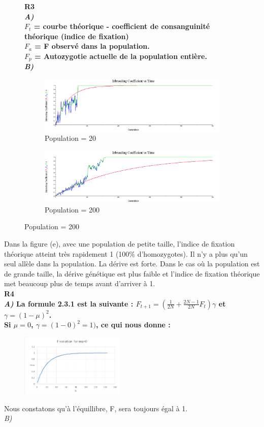 \documentclass[a4paper]{report}
\renewcommand{\textbf}[1]{\begingroup\bfseries\mathversion{bold}#1\endgroup}
\begin{document}
\begin{figure}[!h]
\textbf{R3}\\
\textit{A)}\\
$F_t$ = courbe théorique - coefficient de consanguinité théorique (indice de fixation)\\
$F_a$ = F observé dans la population. \\
$F_p$ = Autozygotie actuelle de la population entière.\\

\textit{B)}\\
	\begin{subfigure}{.5\textwidth}
	\centering
	\includegraphics[width=.99\linewidth]{r3_3.png}
	\caption{Population = 20}
\end{subfigure}%
\begin{subfigure}{.5\textwidth}
	\centering
	\includegraphics[width=.99\linewidth]{r3_4.png}
	\caption{Population = 200}
\end{subfigure}

\end{figure}
Dans la figure (e), avec une population de petite taille, l'indice de fixation théorique atteint très rapidement 1 (100\% d'homozygotes). Il n'y a plus qu'un seul allèle dans la population. La dérive est forte. Dans le cas où la population est de grande taille, la dérive génétique est plus faible et l'indice de fixation théorique met beaucoup plus de temps avant d'arriver à 1. \\

\textbf{R4}\\
\textit{A)} La formule 2.3.1 est la suivante : $F_{t+1}=(\frac{1}{2N}+\frac{2N-1}{2N}F_t)\gamma$ et $\gamma = (1-\mu)^2$. \\
Si $\mu=0$, $\gamma=(1-0)^2 =1)$, ce qui nous donne : \\


\begin{figure}
	\includegraphics[width=5cm]{mu0.png}
\end{figure}

Nous constatons qu'à l'équillibre, F, sera toujours égal à 1. \\

\textit{B)} 
\end{document}
